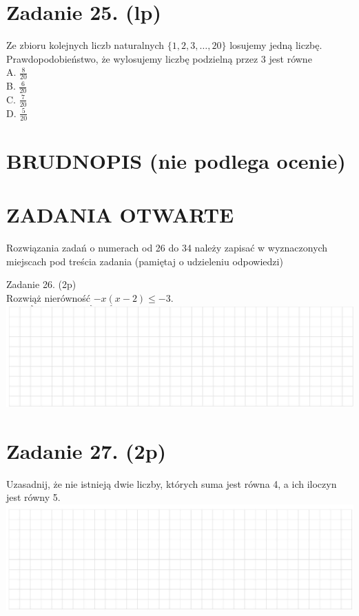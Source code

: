 \documentclass[10pt]{article}
\begin{document}
\section*{Zadanie 25. (lp)}
Ze zbioru kolejnych liczb naturalnych \(\{1,2,3, \ldots, 20\}\) losujemy jedną liczbę. Prawdopodobieństwo, że wylosujemy liczbę podzielną przez 3 jest równe\\
A. \(\frac{8}{20}\)\\
B. \(\frac{6}{20}\)\\
C. \(\frac{7}{20}\)\\
D. \(\frac{5}{20}\)

\section*{BRUDNOPIS (nie podlega ocenie)}
\section*{ZADANIA OTWARTE}
Rozwiązania zadań o numerach od 26 do 34 należy zapisać w wyznaczonych miejscach pod treścia zadania (pamiętaj o udzieleniu odpowiedzi)

Zadanie 26. (2p)\\
Rozwiąż nierówność \(-x(x-2) \leq-3\).\\
\includegraphics[max width=\textwidth, center]{2024_11_21_92d5a9232f32cac9f1a4g-09(1)}

\section*{Zadanie 27. (2p)}
Uzasadnij, że nie istnieją dwie liczby, których suma jest równa 4, a ich iloczyn jest równy 5.\\
\includegraphics[max width=\textwidth, center]{2024_11_21_92d5a9232f32cac9f1a4g-09(2)}
\end{document}
